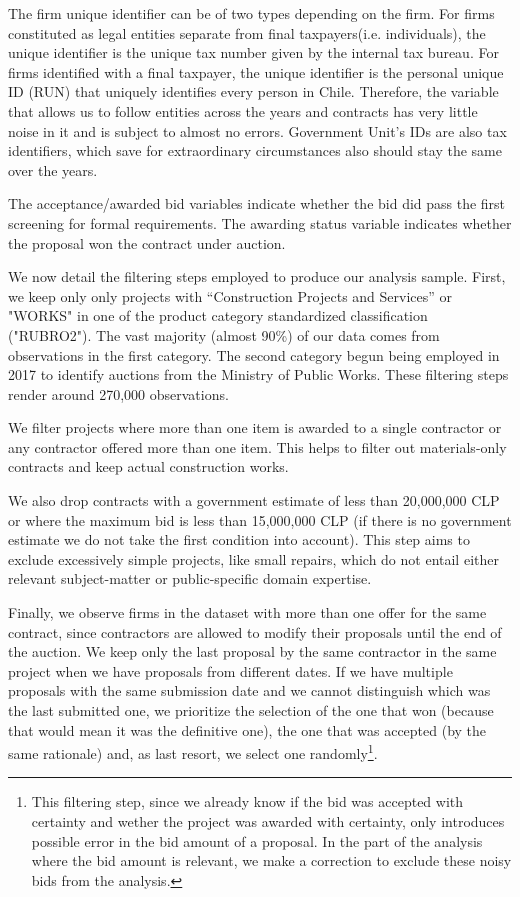 
The firm unique identifier can be of two types depending on the firm. For firms constituted as legal entities separate from final taxpayers(i.e. individuals), the unique identifier is the unique tax number given by the internal tax bureau. For firms identified with a final taxpayer, the unique identifier is the personal unique ID (RUN) that uniquely identifies every person in Chile. Therefore, the variable that allows us to follow entities across the years and contracts has very little noise in it and is subject to almost no errors. Government Unit's IDs are also tax identifiers, which save for extraordinary circumstances also should stay the same over the years.

The acceptance/awarded bid variables indicate whether the bid did pass the first screening for formal requirements. The awarding status variable indicates whether the proposal won the contract under auction.

We now detail the filtering steps employed to produce our analysis sample. First, we keep only only projects with “Construction Projects and Services” or "WORKS"  in one of the product category standardized classification ("RUBRO2"). The vast majority (almost 90\%) of our data comes from observations in the first category. The second category begun being employed in 2017 to identify auctions from the Ministry of Public Works. These filtering steps render around 270,000 observations.

We filter projects where more than one item is awarded to a single contractor or any contractor offered more than one item. This helps to filter out materials-only contracts and keep actual construction works.

We also drop contracts with a government estimate of less than 20,000,000 CLP or where the maximum bid is less than 15,000,000 CLP (if there is no government estimate we do not take the first condition into account). This step aims to exclude excessively simple projects, like small repairs, which do not entail either relevant subject-matter or public-specific domain expertise.

Finally, we observe firms in the dataset with more than one offer for the same contract, since contractors are allowed to modify their proposals until the end of the auction. We keep only the last proposal by the same contractor in the same project when we have proposals from different dates. If we have multiple proposals with the same submission date and we cannot distinguish which was the last submitted one, we prioritize the selection of the one that won (because that would mean it was the definitive one), the one that was accepted (by the same rationale) and, as last resort, we select one randomly\footnote{This filtering  step, since we already know if the bid was accepted with certainty and wether the project was awarded with certainty, only introduces possible error in the bid amount of a proposal. In the part of the analysis where the bid amount is relevant, we make a correction to exclude these noisy bids from the analysis.}.

